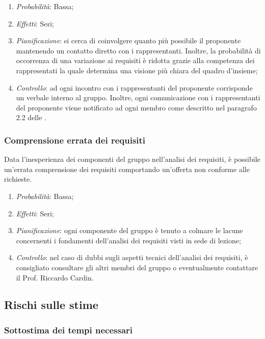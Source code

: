 \begin{enumerate}
\item \textit{Probabilità}: Bassa;
\item \textit{Effetti}: Seri;
\item \textit{Pianificazione}: si cerca di coinvolgere quanto più possibile il proponente mantenendo un contatto diretto con i rappresentanti. Inoltre, la probabilità di occorrenza di una variazione ai requisiti è ridotta grazie alla competenza dei rappresentati la quale determina una visione più chiara del quadro d'insieme;
\item \textit{Controllo}: ad ogni incontro con i rappresentanti del proponente corrisponde un verbale interno al gruppo. Inoltre, ogni comunicazione con i rappresentanti del proponente viene notificato ad ogni membro come descritto nel paragrafo 2.2 delle \NormeDiProgetto.  
\end{enumerate}
		
		\subsubsection{Comprensione errata dei requisiti}

Data l'inesperienza dei componenti del gruppo nell'analisi dei requisiti, è possibile un'errata comprensione dei requisiti comportando un'offerta non conforme alle richieste.

\begin{enumerate}
\item \textit{Probabilità}: Bassa;
\item \textit{Effetti}: Seri;
\item \textit{Pianificazione}: ogni componente del gruppo è tenuto a colmare le lacune concernenti i fondamenti dell'analisi dei requisiti visti in sede di lezione;
\item \textit{Controllo}: nel caso di dubbi sugli aspetti tecnici dell'analisi dei requisiti, è consigliato consultare gli altri membri del gruppo o eventualmente contattare il Prof. Riccardo Cardin.
\end{enumerate}

	\subsection{Rischi sulle stime}
	
		\subsubsection{Sottostima dei tempi necessari}


